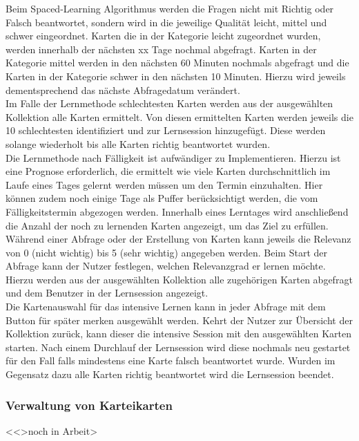 Beim Spaced-Learning Algorithmus werden die Fragen nicht mit Richtig oder Falsch beantwortet, sondern wird in die jeweilige Qualität leicht, mittel und schwer eingeordnet. Karten die in der Kategorie leicht zugeordnet wurden, werden innerhalb der nächsten xx Tage nochmal abgefragt. Karten in der Kategorie mittel werden in den nächsten 60 Minuten nochmals abgefragt und die Karten in der Kategorie schwer in den nächsten 10 Minuten. Hierzu wird jeweils dementsprechend das nächste Abfragedatum verändert. \\

Im Falle der Lernmethode \glqq{}schlechtesten Karten \grqq{} werden aus der ausgewählten Kollektion alle Karten ermittelt. Von diesen ermittelten Karten werden jeweils die 10 schlechtesten identifiziert und zur Lernsession hinzugefügt. Diese werden solange wiederholt bis alle Karten richtig beantwortet wurden. \\

Die Lernmethode nach Fälligkeit ist aufwändiger zu Implementieren. Hierzu ist eine Prognose erforderlich, die ermittelt wie viele Karten durchschnittlich im Laufe eines Tages gelernt werden müssen um den Termin einzuhalten. Hier können zudem noch einige Tage als Puffer berücksichtigt werden, die vom Fälligkeitstermin abgezogen werden. Innerhalb eines Lerntages wird anschließend die Anzahl der noch zu lernenden Karten angezeigt, um das Ziel zu erfüllen. \\

Während einer Abfrage oder der Erstellung von Karten kann jeweils die Relevanz von 0 (nicht wichtig) bis 5 (sehr wichtig) angegeben werden. Beim Start der Abfrage kann der Nutzer festlegen, welchen Relevanzgrad er lernen möchte. Hierzu werden aus der ausgewählten Kollektion alle zugehörigen Karten abgefragt und dem Benutzer in der Lernsession angezeigt. \\

Die Kartenauswahl für das intensive Lernen kann in jeder Abfrage mit dem Button \glqq für später merken\grqq{}
 ausgewählt werden. Kehrt der Nutzer zur Übersicht der Kollektion zurück, kann dieser die intensive Session mit den ausgewählten Karten starten. Nach einem Durchlauf der Lernsession wird diese nochmals neu gestartet für den Fall falls mindestens eine Karte falsch beantwortet wurde. Wurden im Gegensatz dazu alle Karten richtig beantwortet wird die Lernsession beendet.

\subsubsection{Verwaltung von Karteikarten}
<<>noch in Arbeit>





